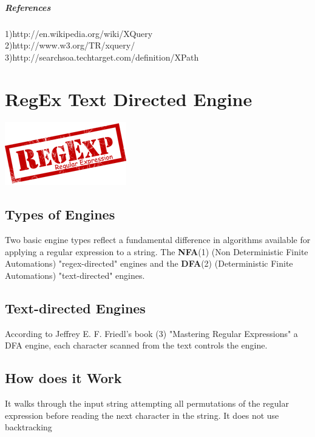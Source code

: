 \documentclass[a4paper,11pt]{report}
\begin{document}
\paragraph{References\\}
1)http://en.wikipedia.org/wiki/XQuery \\
2)http://www.w3.org/TR/xquery/ \\
3)http://searchsoa.techtarget.com/definition/XPath \\


\chapter{RegEx Text Directed Engine}

\begin{center}
\includegraphics{images/regexp_logo.png}~\\[1cm]
\end{center}

\section{Types of Engines}
\begin{flushleft}
Two basic engine types reflect a fundamental difference in algorithms available for applying a regular expression to a string. The \textbf{NFA}{\footnotesize (1)} (Non Deterministic Finite Automations) "regex-directed" engines and the \textbf{DFA}{\footnotesize (2)} (Deterministic Finite Automations) "text-directed" engines.
\end{flushleft}

\section{Text-directed Engines}
\begin{center}
According to Jeffrey E. F. Friedl’s book {\footnotesize (3)} "Mastering Regular Expressions" a DFA engine, each character scanned from the text controls the engine.
\end{center}

\section{How does it Work}
\begin{flushright}
It walks through the input string attempting all permutations of the regular expression before reading the next character in the string. It does not use backtracking
\end{flushright}
\end{document}
